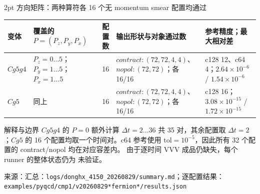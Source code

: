 \documentclass[UTF8,aspectratio=169,11pt]{ctexbeamer}
\newcommand{\source}[1]{\vspace{0.05em}\par{\raggedright\scriptsize\color{muted}来源：#1\par}}
\newcommand{\codepath}[1]{\nolinkurl{#1}}
\newcommand{\unverified}{\textcolor{warning}{未验证}}
\begin{document}
\begin{frame}[t]{2pt 方向矩阵：两种算符各 16 个无 momentum smear 配置均通过}
  \footnotesize
  \renewcommand{\arraystretch}{1.08}
  \begin{tabularx}{0.96\textwidth}{@{}L Y r Y Y@{}}
    \toprule
    变体 & 覆盖的 $P=(P_z,P_y,P_x)$ & 配置数 & 输出形状与对象通过数 & 参考精度；最大相对差\\
    \midrule
    $Cg5g4$ & $P_z=0\ldots5$；$P_y=1\ldots5$；$P_x=1\ldots5$ & 16 &
      $contract:(72,72,4,4)$、$nopol:(72,72)$；各 16/16 &
      c128 12、c64 4；$2.64\times10^{-6}$ / $1.54\times10^{-6}$\\
    $Cg5$ & 同上 & 16 &
      $contract:(72,72,4,4)$、$nopol:(72,72)$；各 16/16 &
      c128 16；$3.08\times10^{-15}$ / $1.72\times10^{-15}$\\
    \bottomrule
  \end{tabularx}
  \vspace{0.12em}
  \begin{block}{解释与边界}
    $Cg5g4$ 的 $P=0$ 额外计算 $\Delta t=2\ldots36$ 共 35 对，其余配置取
    $\Delta t=2$；$Cg5$ 的 16 个配置均取一个时间对。c64 参考使用
    $\mathrm{tol}=10^{-5}$，因此所有 32 个配置的 contract/nopol 均在对应容差内。
    由于逐时间 VVV 成品仍缺失，每个 runner 的整体状态仍为 \unverified。
  \end{block}
  \source{汇总：\codepath{logs/donghx_4150_20260829/summary.md}；逐配置结果：\codepath{examples/pyqcd/cmp1/v20260829*fermion*/results.json}}
\end{frame}
\end{document}
